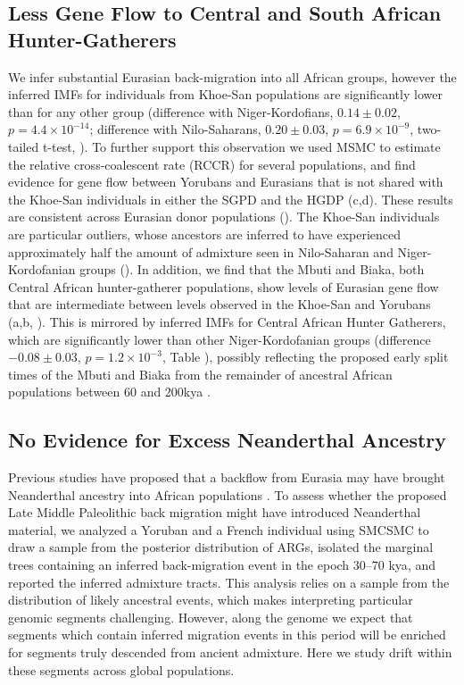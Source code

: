 \subsection{Less Gene Flow to Central and South African Hunter-Gatherers} We infer substantial Eurasian back-migration into all African groups, however the inferred IMFs for individuals from Khoe-San populations are significantly lower than for any other group (difference with Niger-Kordofians, $0.14 \pm 0.02$, $p = 4.4 \times 10^{-14}$; difference with Nilo-Saharans, $0.20 \pm 0.03$, $p = 6.9 \times 10^{-9}$, two-tailed t-test, ). To further support this observation we used MSMC to estimate the relative cross-coalescent rate (RCCR) for several populations, and find evidence for gene flow between Yorubans and Eurasians that is not shared with the Khoe-San individuals in either the SGPD and the HGDP (c,d). These results are consistent across Eurasian donor populations (). The Khoe-San individuals are particular outliers, whose ancestors are inferred to have experienced approximately half the amount of admixture seen in Nilo-Saharan and Niger-Kordofanian groups (). 
In addition, we find that the Mbuti and Biaka, both Central African hunter-gatherer populations, show levels of Eurasian gene flow that are intermediate between levels observed in the Khoe-San and Yorubans (a,b, ).  This is mirrored by inferred IMFs for Central African Hunter Gatherers, which are significantly lower than other Niger-Kordofanian groups (difference $-0.08 \pm 0.03$, $p = 1.2 \times 10^{-3}$, Table ), possibly reflecting the proposed early split times of the Mbuti and Biaka from the remainder of ancestral African populations between 60 and 200kya \cite{Patin2017, Lipson2019}. 

\subsection{No Evidence for Excess Neanderthal Ancestry} Previous studies have proposed that a backflow from Eurasia may have brought Neanderthal ancestry into African populations \cite{Chen2020}. To assess whether the proposed Late Middle Paleolithic back migration might have introduced Neanderthal material, we analyzed a Yoruban and a French individual using SMCSMC to draw a sample from the posterior distribution of ARGs, isolated the marginal trees containing an inferred back-migration event in the epoch $30$--$70$ \gls{kya}, and reported the inferred admixture tracts. This analysis relies on a sample from the distribution of likely ancestral events, which makes interpreting particular genomic segments challenging. However, along the genome we expect that segments which contain inferred migration events in this period will be enriched for segments truly descended from ancient admixture. Here we study drift within these segments across global populations. 

